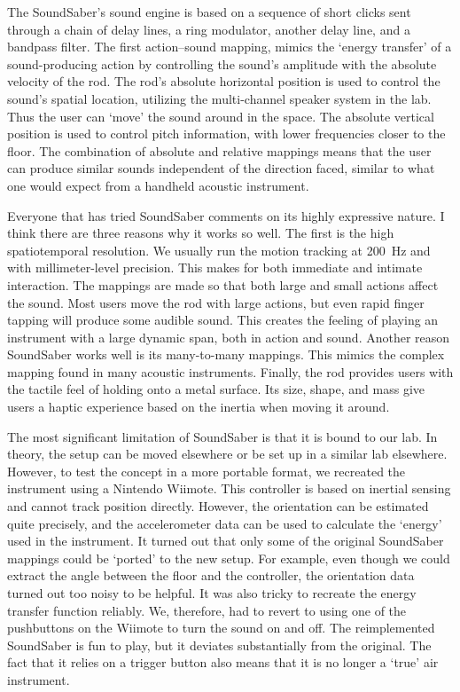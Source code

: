 The SoundSaber's sound engine is based on a sequence of short clicks sent through a chain of delay lines, a ring modulator, another delay line, and a bandpass filter. The first action--sound mapping, mimics the `energy transfer' of a sound-producing action by controlling the sound's amplitude with the absolute velocity of the rod. The rod's absolute horizontal position is used to control the sound's spatial location, utilizing the multi-channel speaker system in the lab. Thus the user can `move' the sound around in the space. The absolute vertical position is used to control pitch information, with lower frequencies closer to the floor. The combination of absolute and relative mappings means that the user can produce similar sounds independent of the direction faced, similar to what one would expect from a handheld acoustic instrument.

Everyone that has tried SoundSaber comments on its highly expressive nature. I think there are three reasons why it works so well. The first is the high spatiotemporal resolution. We usually run the motion tracking at 200~Hz and with millimeter-level precision. This makes for both immediate and intimate interaction. The mappings are made so that both large and small actions affect the sound. Most users move the rod with large actions, but even rapid finger tapping will produce some audible sound. This creates the feeling of playing an instrument with a large dynamic span, both in action and sound. Another reason SoundSaber works well is its many-to-many mappings. This mimics the complex mapping found in many acoustic instruments. Finally, the rod provides users with the tactile feel of holding onto a metal surface. Its size, shape, and mass give users a haptic experience based on the inertia when moving it around.

The most significant limitation of SoundSaber is that it is bound to our lab. In theory, the setup can be moved elsewhere or be set up in a similar lab elsewhere. However, to test the concept in a more portable format, we recreated the instrument using a Nintendo Wiimote. This controller is based on inertial sensing and cannot track position directly. However, the orientation can be estimated quite precisely, and the accelerometer data can be used to calculate the `energy' used in the instrument. It turned out that only some of the original SoundSaber mappings could be `ported' to the new setup. For example, even though we could extract the angle between the floor and the controller, the orientation data turned out too noisy to be helpful. It was also tricky to recreate the energy transfer function reliably. We, therefore, had to revert to using one of the pushbuttons on the Wiimote to turn the sound on and off. The reimplemented SoundSaber is fun to play, but it deviates substantially from the original. The fact that it relies on a trigger button also means that it is no longer a `true' air instrument.


